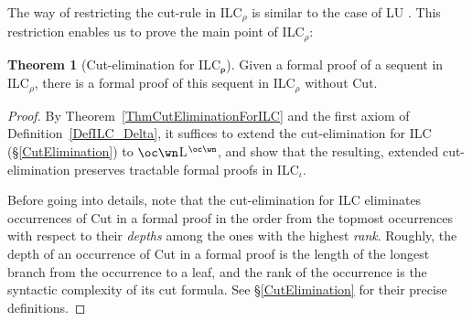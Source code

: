 \documentclass[a4paper]{article}
\theoremstyle{definition}
\theoremstyle{theorem}
\newtheorem{theorem}[definition]{Theorem}
\theoremstyle{remark}
\begin{document}
The way of restricting the cut-rule in \textsf{ILC}$_\rho$ is similar to the case of \textsf{LU} \cite[Figure~1]{girard1993unity}. %
This restriction enables us to prove the main point of \textsf{ILC}$_\rho$:
\begin{theorem}[Cut-elimination for \textsf{ILC}$_{\boldsymbol{\rho}}$]
\label{ThmCutEliminationForILC_Delta}
Given a formal proof of a sequent in \textsf{ILC}$_\rho$, there is a formal proof of this sequent in \textsf{ILC}$_\rho$ without Cut.
\end{theorem}
\begin{proof}
By Theorem~\ref{ThmCutEliminationForILC} and the first axiom of Definition~\ref{DefILC_Delta}, it suffices to extend the cut-elimination for \textsf{ILC} (\S\ref{CutElimination}) to $\oc\wn$L$^{\oc\wn}$, and show that the resulting, extended cut-elimination preserves tractable formal proofs in \textsf{ILC$_\iota$}.

Before going into details, note that the cut-elimination for \textsf{ILC} eliminates occurrences of Cut in a formal proof in the order from the topmost occurrences with respect to their \emph{depths} among the ones with the highest \emph{rank}.
Roughly, the depth of an occurrence of Cut in a formal proof is the length of the longest branch from the occurrence to a leaf, and the rank of the occurrence is the syntactic complexity of its cut formula.
See \S\ref{CutElimination} for their precise definitions.


\end{proof}
\end{document}
